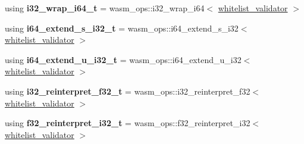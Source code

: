 \begin{DoxyCompactItemize}
\item 
\mbox{\label{structaacio_1_1chain_1_1wasm__validations_1_1op__constrainers_a520e2df2dd147ce409344c289078862e}} 
using {\bfseries i32\+\_\+wrap\+\_\+i64\+\_\+t} = wasm\+\_\+ops\+::i32\+\_\+wrap\+\_\+i64$<$ \mbox{\hyperlink{structaacio_1_1chain_1_1wasm__validations_1_1whitelist__validator}{whitelist\+\_\+validator}} $>$
\item 
\mbox{\label{structaacio_1_1chain_1_1wasm__validations_1_1op__constrainers_af89762ff0369619168ea53eb0c047728}} 
using {\bfseries i64\+\_\+extend\+\_\+s\+\_\+i32\+\_\+t} = wasm\+\_\+ops\+::i64\+\_\+extend\+\_\+s\+\_\+i32$<$ \mbox{\hyperlink{structaacio_1_1chain_1_1wasm__validations_1_1whitelist__validator}{whitelist\+\_\+validator}} $>$
\item 
\mbox{\label{structaacio_1_1chain_1_1wasm__validations_1_1op__constrainers_af7d14ce665259f475fde9264d9a00673}} 
using {\bfseries i64\+\_\+extend\+\_\+u\+\_\+i32\+\_\+t} = wasm\+\_\+ops\+::i64\+\_\+extend\+\_\+u\+\_\+i32$<$ \mbox{\hyperlink{structaacio_1_1chain_1_1wasm__validations_1_1whitelist__validator}{whitelist\+\_\+validator}} $>$
\item 
\mbox{\label{structaacio_1_1chain_1_1wasm__validations_1_1op__constrainers_a3328087bcba661109be76f325e1256d0}} 
using {\bfseries i32\+\_\+reinterpret\+\_\+f32\+\_\+t} = wasm\+\_\+ops\+::i32\+\_\+reinterpret\+\_\+f32$<$ \mbox{\hyperlink{structaacio_1_1chain_1_1wasm__validations_1_1whitelist__validator}{whitelist\+\_\+validator}} $>$
\item 
\mbox{\label{structaacio_1_1chain_1_1wasm__validations_1_1op__constrainers_a554f7c3e82178f8ba6a7613127860ccb}} 
using {\bfseries f32\+\_\+reinterpret\+\_\+i32\+\_\+t} = wasm\+\_\+ops\+::f32\+\_\+reinterpret\+\_\+i32$<$ \mbox{\hyperlink{structaacio_1_1chain_1_1wasm__validations_1_1whitelist__validator}{whitelist\+\_\+validator}} $>$
\item 
\mbox{\label{structaacio_1_1chain_1_1wasm__validations_1_1op__constrainers_ab2a7cc3e7c21748c0844d7fbe9559941}} 

\end{DoxyCompactItemize}
